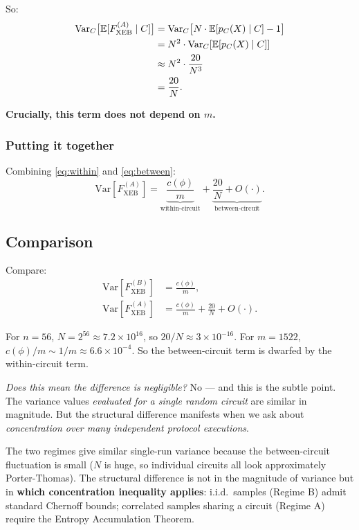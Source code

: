 \documentclass[11pt]{article}
\theoremstyle{definition}
\theoremstyle{remark}
\newcommand{\E}{\mathbb{E}}
\newcommand{\Var}{\mathrm{Var}}
\begin{document}
So:
\begin{align}
  \Var_C\big[\E[F_{\mathrm{XEB}}^{(A)} \mid C]\big]
   &= \Var_C\big[N \cdot \E[p_C(X) \mid C] - 1\big] \notag\\
   &= N^2 \cdot \Var_C[\E[p_C(X) \mid C]] \notag \\
   &\approx N^2 \cdot \frac{20}{N^3} \notag \\
   &= \frac{20}{N}.
   \label{eq:between}
\end{align}

\textbf{Crucially, this term does not depend on $m$.}

\subsubsection*{Putting it together}

Combining \eqref{eq:within} and \eqref{eq:between}:
\begin{equation}
  \Var[F_{\mathrm{XEB}}^{(A)}] = \underbrace{\frac{c(\phi)}{m}}_{\text{within-circuit}}
   + \underbrace{\frac{20}{N} + O(\cdot)}_{\text{between-circuit}}.
   \label{eq:varA}
\end{equation}

\subsection{Comparison}

Compare:
\begin{align*}
  \Var[F_{\mathrm{XEB}}^{(B)}] &= \frac{c(\phi)}{m}, \\
  \Var[F_{\mathrm{XEB}}^{(A)}] &= \frac{c(\phi)}{m} + \frac{20}{N} +
  O(\cdot).
\end{align*}

For $n = 56$, $N = 2^{56} \approx 7.2 \times 10^{16}$, so $20/N \approx
3 \times 10^{-16}$. For $m = 1522$, $c(\phi)/m \sim 1/m \approx 6.6
\times 10^{-4}$. So the between-circuit term is dwarfed by the
within-circuit term.

\textit{Does this mean the difference is negligible?} No --- and this is
the subtle point. The variance values \emph{evaluated for a single
random circuit} are similar in magnitude. But the structural difference
manifests when we ask about \emph{concentration over many independent
protocol executions}.

\begin{intuition}
The two regimes give similar single-run variance because the
between-circuit fluctuation is small ($N$ is huge, so individual circuits
all look approximately Porter-Thomas). The structural difference is not
in the magnitude of variance but in \textbf{which concentration
inequality applies}: i.i.d.\ samples (Regime B) admit standard Chernoff
bounds; correlated samples sharing a circuit (Regime A) require the
Entropy Accumulation Theorem.
\end{intuition}
\end{document}
